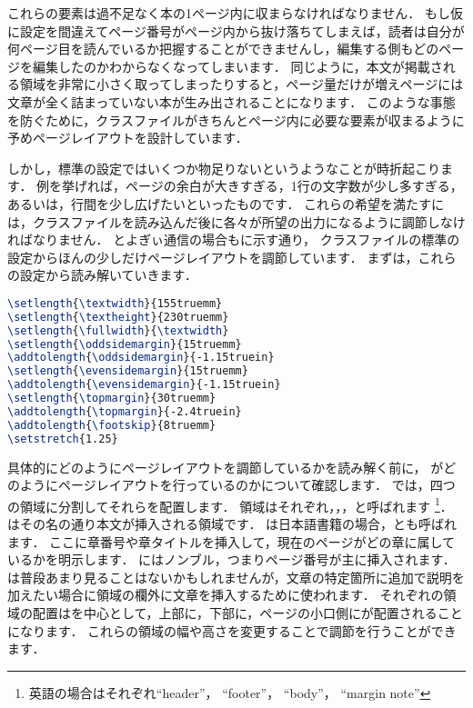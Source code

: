 これらの要素は過不足なく本の1ページ内に収まらなければなりません．
もし仮に設定を間違えてページ番号がページ内から抜け落ちてしまえば，読者は自分が何ページ目を読んでいるか把握することができませんし，編集する側もどのページを編集したのかわからなくなってしまいます．
同じように，本文が掲載される領域を非常に小さく取ってしまったりすると，ページ量だけが増えページには文章が全く詰まっていない本が生み出されることになります．
このような事態を防ぐために，クラスファイルがきちんとページ内に必要な要素が収まるように予めページレイアウトを設計しています．

しかし，標準の設定ではいくつか物足りないというようなことが時折起こります．
例を挙げれば，ページの余白が大きすぎる，1行の文字数が少し多すぎる，あるいは，行間を少し広げたいといったものです．
これらの希望を満たすには，クラスファイルを読み込んだ後に各々が所望の出力になるように調節しなければなりません．
とよぎぃ通信の場合もに示す通り，
クラスファイルの標準の設定からほんの少しだけページレイアウトを調節しています．
まずは，これらの設定から読み解いていきます．
\begin{lstlisting}[caption = ページレイアウトの調節,label = list:layout,language = tex]
\setlength{\textwidth}{155truemm}
\setlength{\textheight}{230truemm}
\setlength{\fullwidth}{\textwidth}
\setlength{\oddsidemargin}{15truemm}
\addtolength{\oddsidemargin}{-1.15truein}
\setlength{\evensidemargin}{15truemm}
\addtolength{\evensidemargin}{-1.15truein}
\setlength{\topmargin}{30truemm}
\addtolength{\topmargin}{-2.4truein}
\addtolength{\footskip}{8truemm}
\setstretch{1.25}
\end{lstlisting}

具体的にどのようにページレイアウトを調節しているかを読み解く前に，
{\pLaTeX}がどのようにページレイアウトを行っているのかについて確認します．
{\pLaTeX}では，四つの領域に分割してそれらを配置します．
領域はそれぞれ，，，と呼ばれます
\footnote{英語の場合はそれぞれ``header''， ``footer''， ``body''， ``margin note''}．
はその名の通り本文が挿入される領域です．
は日本語書籍の場合，とも呼ばれます．
ここに章番号や章タイトルを挿入して，現在のページがどの章に属しているかを明示します．
にはノンブル，つまりページ番号が主に挿入されます．
は普段あまり見ることはないかもしれませんが，文章の特定箇所に追加で説明を加えたい場合に領域の欄外に文章を挿入するために使われます．
それぞれの領域の配置はを中心として，上部に，下部に，ページの小口側にが配置されることになります．
これらの領域の幅や高さを変更することで調節を行うことができます．

